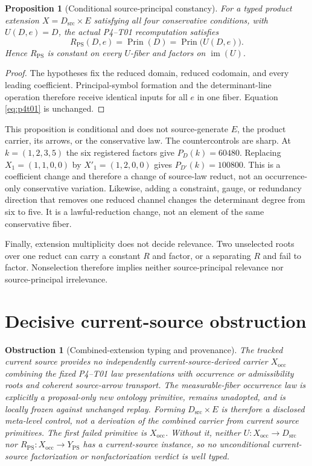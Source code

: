 \documentclass[11pt]{article}
\newtheorem{proposition}{Proposition}
\newtheorem{obstruction}{Obstruction}
\newcommand{\im}{\operatorname{im}}
\begin{document}
\begin{proposition}[Conditional source-principal constancy]
For a typed product extension $X=D_{\mathrm{src}}\times E$ satisfying all
four conservative conditions, with $U(D,e)=D$, the actual P4--T01
recomputation satisfies
\begin{equation}
 R_{\mathrm{PS}}(D,e)=\operatorname{Prin}(D)
 =\operatorname{Prin}\bigl(U(D,e)\bigr).
\end{equation}
Hence $R_{\mathrm{PS}}$ is constant on every $U$-fiber and factors on
$\im(U)$.
\end{proposition}

\begin{proof}
The hypotheses fix the reduced domain, reduced codomain, and every leading
coefficient.  Principal-symbol formation and the determinant-line operation
therefore receive identical inputs for all $e$ in one fiber.  Equation
\eqref{eq:p4t01} is unchanged.
\end{proof}

This proposition is conditional and does not source-generate $E$, the product
carrier, its arrows, or the conservative law.  The countercontrols are sharp.
At $k=(1,2,3,5)$ the six registered factors give $P_D(k)=60480$.  Replacing
$X_1=(1,1,0,0)$ by $X'_1=(1,2,0,0)$ gives $P_{D'}(k)=100800$.  This is a
coefficient change and therefore a change of source-law reduct, not an
occurrence-only conservative variation.  Likewise, adding a constraint,
gauge, or redundancy direction that removes one reduced channel changes the
determinant degree from six to five.  It is a lawful-reduction change, not an
element of the same conservative fiber.

Finally, extension multiplicity does not decide relevance.  Two unselected
roots over one reduct can carry a constant $R$ and factor, or a separating
$R$ and fail to factor.  Nonselection therefore implies neither
source-principal relevance nor source-principal irrelevance.

\section{Decisive current-source obstruction}

\begin{obstruction}[Combined-extension typing and provenance]
The tracked current source provides no independently current-source-derived
carrier $X_{\mathrm{occ}}$ combining the fixed P4--T01 law presentations with
occurrence or admissibility roots and coherent source-arrow transport.  The
measurable-fiber occurrence law is explicitly a proposal-only new ontology
primitive, remains unadopted, and is locally frozen against unchanged replay.
Forming $D_{\mathrm{src}}\times E$ is therefore a disclosed meta-level control,
not a derivation of the combined carrier from current source primitives.  The
first failed primitive is $X_{\mathrm{occ}}$.  Without it, neither
$U:X_{\mathrm{occ}}\to D_{\mathrm{src}}$ nor
$R_{\mathrm{PS}}:X_{\mathrm{occ}}\to Y_{\mathrm{PS}}$ has a current-source
instance, so no unconditional current-source factorization or
nonfactorization verdict is well typed.
\end{obstruction}
\end{document}
